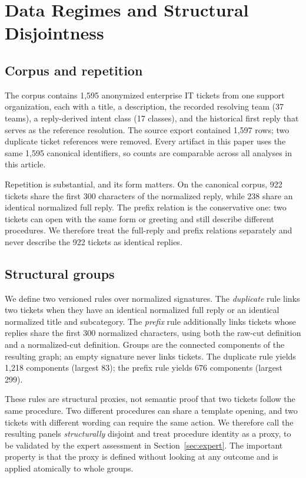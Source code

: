 \section{Data Regimes and Structural Disjointness}
\label{sec:data}

\subsection{Corpus and repetition}
The corpus contains 1,595 anonymized enterprise IT tickets from one support
organization, each with a title, a description, the recorded resolving team
(37 teams), a reply-derived intent class (17 classes), and the historical first
reply that serves as the reference resolution. The source export contained 1,597
rows; two duplicate ticket references were removed. Every artifact in this paper
uses the same 1,595 canonical identifiers, so counts are comparable across all
analyses in this article.

Repetition is substantial, and its form matters. On the canonical corpus, 922
tickets share the first 300 characters of the normalized reply, while 238 share an
identical normalized full reply. The prefix relation is the conservative one: two tickets can open with the
same form or greeting and still describe different procedures. We therefore treat
the full-reply and prefix relations separately and never describe the 922 tickets
as identical replies.

\subsection{Structural groups}
We define two versioned rules over normalized signatures. The \emph{duplicate}
rule links two tickets when they have an identical normalized full reply or an
identical normalized title and subcategory. The \emph{prefix} rule additionally
links tickets whose replies share the first 300 normalized characters, using both
the raw-cut definition and a normalized-cut definition. Groups are the
connected components of the resulting graph; an empty signature never links
tickets. The duplicate rule yields 1,218 components (largest 83); the prefix rule
yields 676 components (largest 299).

These rules are structural proxies, not semantic proof that two tickets follow the
same procedure. Two different procedures can share a template opening, and two
tickets with different wording can require the same action. We therefore call the
resulting panels \emph{structurally} disjoint and treat procedure identity as a
proxy, to be validated by the expert assessment in Section~\ref{sec:expert}. The
important property is that the proxy is defined without looking at any outcome and
is applied atomically to whole groups.

